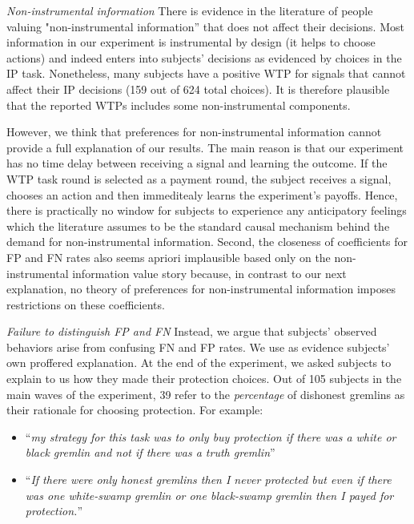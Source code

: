 \documentclass[12pt,a4paper]{article}
\begin{document}
\emph{Non-instrumental information} There is evidence in the literature of people valuing "non-instrumental information'' that does not affect their decisions. Most information in our experiment is instrumental by design (it helps to choose actions) and indeed enters into subjects' decisions as evidenced by choices in the IP task. Nonetheless, many subjects have a positive WTP for signals that cannot affect their IP decisions (159 out of 624 total choices). It is therefore plausible that the reported WTPs includes some non-instrumental components. 

However, we think that preferences for non-instrumental information cannot provide a full explanation of our results. The main reason is that our experiment has no time delay between receiving a signal and learning the outcome. If the WTP task round is selected as a payment round, the subject receives a signal, chooses an action and then immeditealy learns the experiment's payoffs. Hence, there is practically no window for subjects to experience any anticipatory feelings which the literature assumes to be the standard causal mechanism behind the demand for non-instrumental information. Second, the closeness of coefficients for FP and FN rates also seems apriori implausible based only on the non-instrumental information value story because, in contrast to our next explanation, no theory of preferences for non-instrumental information imposes restrictions on these coefficients.

\emph{Failure to distinguish FP and FN} Instead, we argue that subjects' observed behaviors arise from confusing FN and FP rates. We use as evidence subjects' own proffered explanation.  At the end of the experiment, we asked subjects to explain to us how they made their protection choices.  Out of 105 subjects in the main waves of the experiment, 39 refer to the \textit{percentage} \normalfont  of dishonest gremlins as their rationale for choosing protection. For example:
\begin{itemize}
	\item ``\emph{my strategy for this task was to only buy protection if there was a white or black gremlin and not if there was a truth gremlin}''
	\item ``\emph{If there were only honest gremlins then I never protected but even if there was one white-swamp gremlin or one black-swamp gremlin then I payed for protection.}''
\end{itemize}
\end{document}
